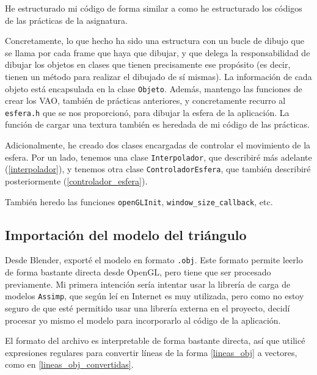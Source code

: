 \documentclass[a4paper,12pt]{article}
\begin{document}
He estructurado mi código de forma similar a como he estructurado los códigos de las prácticas de la asignatura.

Concretamente, lo que hecho ha sido una estructura con un bucle de dibujo que se llama por cada frame que haya que dibujar, y que delega la responsabilidad de dibujar los objetos en clases que tienen precisamente ese propósito (es decir, tienen un método para realizar el dibujado de sí mismas). La información de cada objeto está encapsulada en la clase \texttt{Objeto}. Además, mantengo las funciones de crear los VAO, también de prácticas anteriores, y concretamente recurro al \texttt{esfera.h} que se nos proporcionó, para dibujar la esfera de la aplicación. La función de cargar una textura también es heredada de mi código de las prácticas.

Adicionalmente, he creado dos clases encargadas de controlar el movimiento de la esfera. Por un lado, tenemos una clase \texttt{Interpolador}, que describiré más adelante (\ref{interpolador}), y tenemos otra clase \texttt{ControladorEsfera}, que también describiré posteriormente (\ref{controlador_esfera}).

También heredo las funciones \texttt{openGLInit}, \texttt{window\_size\_callback}, etc.

\subsection{Importación del modelo del triángulo}

Desde Blender, exporté el modelo en formato \texttt{.obj}. Este formato permite leerlo de forma bastante directa desde OpenGL, pero tiene que ser procesado previamente. Mi primera intención sería intentar usar la librería de carga de modelos \texttt{Assimp}, que según leí en Internet es muy utilizada, pero como no estoy seguro de que esté permitido usar una librería externa en el proyecto, decidí procesar yo mismo el modelo para incorporarlo al código de la aplicación.

El formato del archivo es interpretable de forma bastante directa, así que utilicé expresiones regulares para convertir líneas de la forma \ref{lineas_obj} a vectores, como en \ref{lineas_obj_convertidas}.
\end{document}
